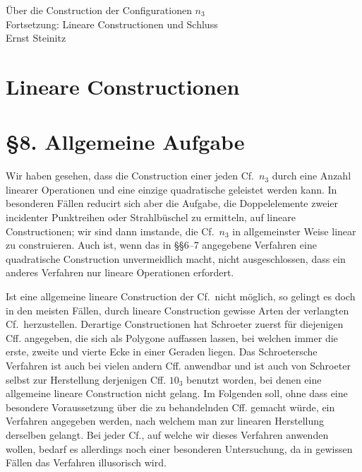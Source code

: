 \documentclass[11pt]{article}
\newcommand{\Cf}{\textup{Cf.}}
\begin{document}
\begin{center}
{\Large Über die Construction der Configurationen $n_3$}\\[0.4em]
{\large Fortsetzung: Lineare Constructionen und Schluss}\\[0.3em]
{\normalsize Ernst Steinitz}
\end{center}


\section*{Lineare Constructionen}
\section*{\S 8. Allgemeine Aufgabe}
Wir haben gesehen, dass die Construction einer jeden \Cf\ $n_3$ durch eine Anzahl linearer Operationen und eine einzige quadratische geleistet werden kann. In besonderen Fällen reducirt sich aber die Aufgabe, die Doppelelemente zweier incidenter Punktreihen oder Strahlbüschel zu ermitteln, auf lineare Constructionen; wir sind dann imstande, die \Cf\ $n_3$ in allgemeinster Weise linear zu construieren. Auch ist, wenn das in \S\S 6--7 angegebene Verfahren eine quadratische Construction unvermeidlich macht, nicht ausgeschlossen, dass ein anderes Verfahren nur lineare Operationen erfordert.

Ist eine allgemeine lineare Construction der \Cf\ nicht möglich, so gelingt es doch in den meisten Fällen, durch lineare Construction gewisse Arten der verlangten \Cf\ herzustellen. Derartige Constructionen hat Schroeter zuerst für diejenigen Cff. angegeben, die sich als Polygone auffassen lassen, bei welchen immer die erste, zweite und vierte Ecke in einer Geraden liegen. Das Schroetersche Verfahren ist auch bei vielen andern Cff. anwendbar und ist auch von Schroeter selbst zur Herstellung derjenigen Cff. $10_3$ benutzt worden, bei denen eine allgemeine lineare Construction nicht gelang. Im Folgenden soll, ohne dass eine besondere Voraussetzung über die zu behandelnden Cff. gemacht würde, ein Verfahren angegeben werden, nach welchem man zur linearen Herstellung derselben gelangt. Bei jeder \Cf, auf welche wir dieses Verfahren anwenden wollen, bedarf es allerdings noch einer besonderen Untersuchung, da in gewissen Fällen das Verfahren illusorisch wird.
\end{document}
